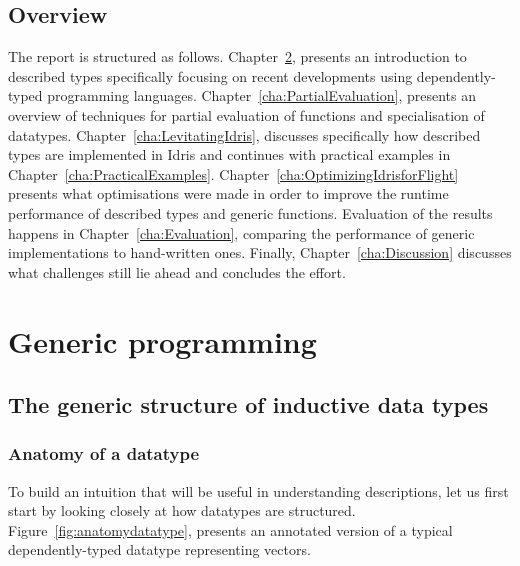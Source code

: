 \documentclass{ituthesis}
\begin{document}
\section{Overview}
\label{sec:Overview}

The report is structured as follows. Chapter~\ref{cha:GenericProgramming}, presents an introduction to described types specifically focusing on recent developments using dependently-typed programming languages.
Chapter~\ref{cha:PartialEvaluation}, presents an overview of techniques for partial evaluation of functions and specialisation of datatypes. Chapter~\ref{cha:LevitatingIdris}, discusses specifically how described types are implemented in Idris and continues with practical examples in Chapter~\ref{cha:PracticalExamples}.
Chapter~\ref{cha:OptimizingIdrisforFlight} presents what optimisations were made in order to improve the runtime performance of described types and generic functions. Evaluation of the results happens in Chapter~\ref{cha:Evaluation}, comparing the performance of generic implementations to hand-written ones.
Finally, Chapter~\ref{cha:Discussion} discusses what challenges still lie ahead and concludes the effort.
\chapter{Generic programming}
\label{cha:GenericProgramming}
\section{The generic structure of inductive data types}
\label{sec:TheGenericStructureofInductiveDataTypes}
\subsection{Anatomy of a datatype}
\label{sub:AnatomyofaDatatype}
To build an intuition that will be useful in understanding descriptions, let us first start by looking closely at how datatypes are structured.
Figure~\ref{fig:anatomydatatype}, presents an annotated version of a typical dependently-typed datatype representing vectors.
\end{document}
